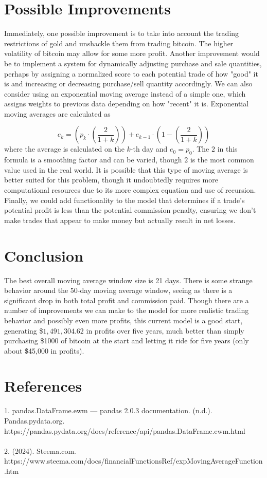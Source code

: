 \documentclass[12pt]{article}
\begin{document}
\section{Possible Improvements}
Immediately, one possible improvement is to take into account the trading restrictions of gold
and unshackle them from trading bitcoin. The higher volatility of bitcoin may allow for some more 
profit. Another improvement would be to implement a system for dynamically adjusting purchase and sale 
quantities, perhaps by assigning a normalized score to each potential trade of how "good" it is and 
increasing or decreasing purchase/sell quantity accordingly. We can also consider using an
exponential moving average instead of a simple one, which assigns weights to previous data depending
on how "recent" it is. Exponential moving averages are calculated as

\begin{equation}
    e_k = \left(p_k \cdot \left( \frac{2}{1+k} \right)\right) + e_{k-1} \cdot \left(1-\left(\frac{2}{1+k}\right)\right)
\end{equation}
where the average is calculated on the $k$-th day and $e_0 = p_0$. The $2$ in this formula is a smoothing factor and can be varied, though $2$ is the most common value used in the real world.
It is possible that this type of moving average is better suited for this problem, though it undoubtedly
requires more computational resources due to its more complex equation and use of recursion. Finally, 
we could add functionality to the model that determines if a trade's potential profit is less than the
potential commission penalty, ensuring we don't make trades that appear to make money but actually result in net losses.


\section{Conclusion}
The best overall moving average window size is 21 days. There is some strange behavior around the 50-day moving average window, seeing as there is a significant drop in both total profit and commission paid.
Though there are a number of improvements we can make to the model for more realistic trading behavior
and possibly even more profits, this current model is a good start, generating \$$1,491,304.62$ in profits over five years, much better than simply purchasing
\$1000 of bitcoin at the start and letting it ride for five years (only about \$45,000 in profits).
\section{References}
1. pandas.DataFrame.ewm — pandas 2.0.3 documentation. (n.d.). Pandas.pydata.org.
\\ https://pandas.pydata.org/docs/reference/api/pandas.DataFrame.ewm.html
\\\\
2.
(2024). Steema.com. \\ https://www.steema.com/docs/financialFunctionsRef/expMovingAverageFunction.htm
\end{document}
